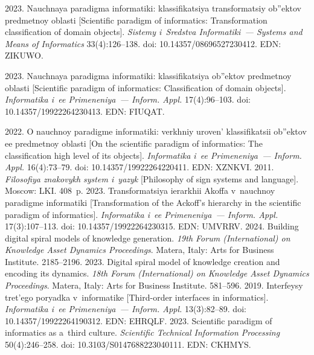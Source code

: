\begin{multicols}{2}
{{\begin{thebibliography}{99}
 2023. Nauchnaya paradigma informatiki: klassifikatsiya 
transformatsiy ob''ektov predmetnoy oblasti [Scientific paradigm of informatics: 
Transformation classification of domain objects]. \textit{Sistemy i~Sredstva 
Informatiki~--- Systems and Means of Informatics} 33(4):126--138. doi: 
10.14357/08696527230412. EDN: ZIKUWO.

 2023. Nauchnaya paradigma informatiki: klassifikatsiya 
ob''ektov predmetnoy oblasti [Scientific paradigm of informatics: Classification of 
domain objects]. \textit{Informatika i~ee Primeneniya~--- Inform. Appl.} 
 17(4):96--103. doi: 10.14357/19922264230413. EDN: FIUQAT.
 
 2022. O nauchnoy paradigme informatiki: verkhniy uroven' 
klassifikatsii ob''ektov ee predmetnoy oblasti [On the scientific paradigm of 
informatics: The classification high level of its objects]. \textit{Informatika i~ee 
Primeneniya~--- Inform. Appl.} 16(4):73--79. doi: 10.14357/19922264220411. EDN: 
XZNKVI.
 2011. \textit{Filosofiya znakovykh system i~yazyk} 
[Philosophy of sign systems and language]. Moscow: LKI. 408~p.
 2023. Transformatsiya ierarkhii Akoffa v~nauchnoy 
paradigme informatiki [Transformation of the Ackoff's hierarchy in the scientific 
paradigm of informatics]. \textit{Informatika i~ee Primeneniya~--- Inform. \mbox{Appl.}} 
17(3):107--113. doi: 10.14357/19922264230315. EDN: UMVRRV.
 2024. Building digital spiral models of knowledge 
generation. \textit{19th Forum (International) on Knowledge Asset Dynamics 
Proceedings}. Matera, Italy: Arts for Business Institute. 2185--2196.
 2023. Digital spiral model of knowledge creation and encoding its 
dynamics. \textit{18th Forum (International) on Knowledge Asset Dynamics 
Proceedings}. Matera, Italy: Arts for Business Institute. 581--596.
 2019. Interfeysy tret'ego poryadka v~informatike 
 [Third-order interfaces in informatics]. \textit{Informatika i~ee Primeneniya~--- 
Inform. Appl.} 13(3):82--89. doi: 10.14357/19922264190312. EDN: EHRQLF.
 2023. Scientific paradigm of informatics as a~third culture. 
\textit{Scientific Technical Information Processing} 50(4):246--258. doi: 
10.3103/S0147688223040111. EDN: CKHMYS.

\end{thebibliography}

 }
 }

\end{multicols}


